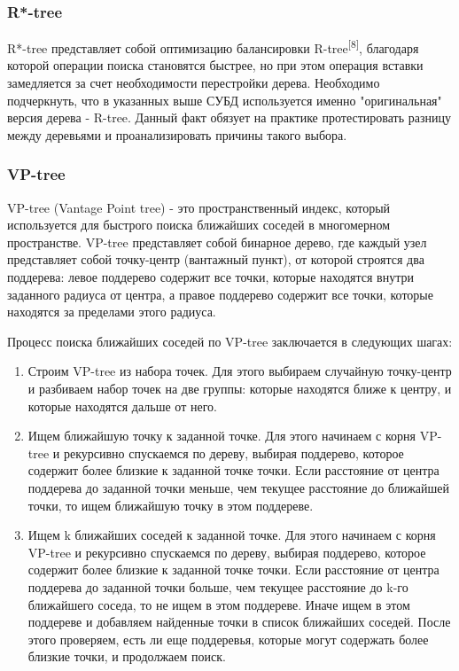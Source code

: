 \subsubsection{R*-tree}
R*-tree представляет собой оптимизацию балансировки R-tree\textsuperscript{[8]}, благодаря которой операции поиска становятся быстрее, но при этом операция вставки замедляется за счет необходимости перестройки дерева. Необходимо подчеркнуть, что в указанных выше СУБД используется именно "оригинальная" версия дерева - R-tree. Данный факт обязует на практике протестировать разницу между деревьями и проанализировать причины такого выбора.

\subsubsection{VP-tree}
VP-tree (Vantage Point tree) - это пространственный индекс, который используется для быстрого поиска ближайших соседей в многомерном пространстве. VP-tree представляет собой бинарное дерево, где каждый узел представляет собой точку-центр (вантажный пункт), от которой строятся два поддерева: левое поддерево содержит все точки, которые находятся внутри заданного радиуса от центра, а правое поддерево содержит все точки, которые находятся за пределами этого радиуса.

Процесс поиска ближайших соседей по VP-tree заключается в следующих шагах:

\begin{enumerate}
    \item Строим VP-tree из набора точек. Для этого выбираем случайную точку-центр и разбиваем набор точек на две группы: которые находятся ближе к центру, и которые находятся дальше от него.
    \item Ищем ближайшую точку к заданной точке. Для этого начинаем с корня VP-tree и рекурсивно спускаемся по дереву, выбирая поддерево, которое содержит более близкие к заданной точке точки. Если расстояние от центра поддерева до заданной точки меньше, чем текущее расстояние до ближайшей точки, то ищем ближайшую точку в этом поддереве.
    \item Ищем k ближайших соседей к заданной точке. Для этого начинаем с корня VP-tree и рекурсивно спускаемся по дереву, выбирая поддерево, которое содержит более близкие к заданной точке точки. Если расстояние от центра поддерева до заданной точки больше, чем текущее расстояние до k-го ближайшего соседа, то не ищем в этом поддереве. Иначе ищем в этом поддереве и добавляем найденные точки в список ближайших соседей. После этого проверяем, есть ли еще поддеревья, которые могут содержать более близкие точки, и продолжаем поиск.
\end{enumerate}

